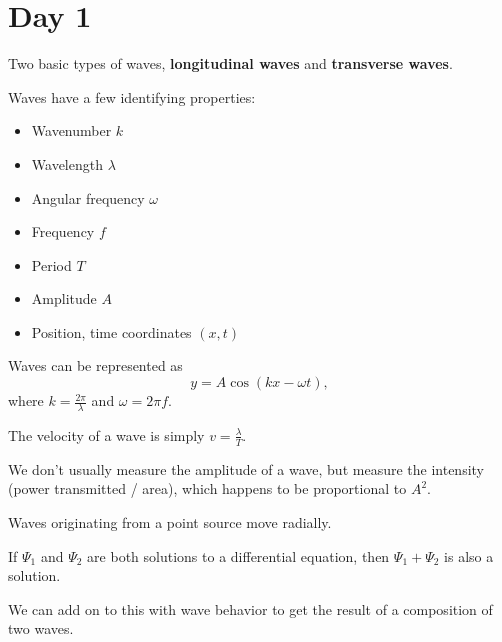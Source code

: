 \section{Day 1}

Two basic types of waves, \textbf{longitudinal waves} and
\textbf{transverse waves}.

Waves have a few identifying properties:
\begin{itemize}
\item Wavenumber $k$
\item Wavelength $\lambda$
\item Angular frequency $\omega$
\item Frequency $f$
\item Period $T$
\item Amplitude $A$
\item Position, time coordinates $(x, t)$
\end{itemize}

Waves can be represented as
\[ y = A \cos (kx - \omega t), \]
where $k = \frac{2 \pi}{\lambda}$ and $\omega = 2 \pi f$.

The velocity of a wave is simply $v = \frac{\lambda}{T}$.

We don't usually measure the amplitude of a wave, but measure the
intensity (power transmitted / area), which happens to be proportional
to $A^2$.

Waves originating from a point source move radially.

\begin{rem}
If $\Psi_1$ and $\Psi_2$ are both solutions to a differential equation,
then $\Psi_1 + \Psi_2$ is also a solution.
\end{rem}

We can add on to this with wave behavior to get the result of a
composition of two waves.
